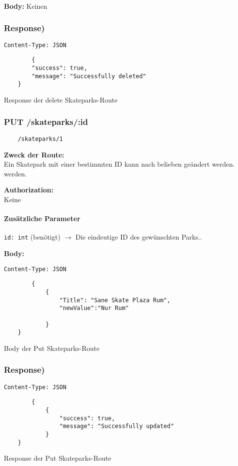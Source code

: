 \textbf{Body:}
Keinen


\subsubsection{Response)}
\begin{code}
    \lstinline{Content-Type: JSON}
    \begin{lstlisting}
        {
        "success": true,
        "message": "Successfully deleted"
    }
    \end{lstlisting}
    \caption{Response der delete Skateparks-Route }
\end{code}

\pagebreak


\subsubsection{PUT /skateparks/:id}

\begin{lstlisting}
    /skateparks/1
\end{lstlisting}

\textbf{Zweck der Route:} \\
Ein Skatepark mit einer bestimmten ID kann nach belieben geändert werden.
werden.

\textbf{Authorization:} \\
Keine

\paragraph{Zusätzliche Parameter}
\lstinline{id: int} (benötigt)
$\rightarrow$ Die eindeutige ID des gewünschten Parks..

\textbf{Body:}\\
\begin{code}
    \lstinline{Content-Type: JSON}
    \begin{lstlisting}
        {
            {
                "Title": "Sane Skate Plaza Rum",
                "newValue":"Nur Rum"
    
            }
    }
    \end{lstlisting}
    \caption{Body der Put Skateparks-Route}
\end{code}

\subsubsection{Response)}
\begin{code}
    \lstinline{Content-Type: JSON}
    \begin{lstlisting}
        {
            {
                "success": true,
                "message": "Successfully updated"
            }
    }
    \end{lstlisting}
    \caption{Response der Put Skateparks-Route}
\end{code}

\pagebreak

